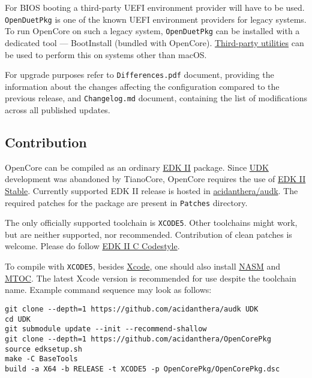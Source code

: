 \documentclass[]{article}
\begin{document}
For BIOS booting a third-party UEFI environment provider will have to
be used. \texttt{OpenDuetPkg} is one of the known UEFI environment providers
for legacy systems. To run OpenCore on such a legacy system, \texttt{OpenDuetPkg}
can be installed with a dedicated tool --- BootInstall (bundled with OpenCore).
\href{https://github.com/corpnewt/gibMacOS}{Third-party utilities} can be used to
perform this on systems other than macOS.

For upgrade purposes refer to \texttt{Differences.pdf} document, providing
the information about the changes affecting the configuration compared
to the previous release, and \texttt{Changelog.md} document, containing
the list of modifications across all published updates.

\subsection{Contribution}\label{configuration-comp}

OpenCore can be compiled as an ordinary
\href{https://github.com/tianocore/tianocore.github.io/wiki/EDK-II}{EDK II} package.
Since \href{https://github.com/tianocore/tianocore.github.io/wiki/UDK}{UDK}
development was abandoned by TianoCore, OpenCore requires the use of
\href{https://github.com/tianocore/tianocore.github.io/wiki/EDK-II#stable-tags}{EDK II Stable}.
Currently supported EDK II release is hosted in
\href{https://github.com/acidanthera/audk}{acidanthera/audk}. The required patches
for the package are present in \texttt{Patches} directory.

The only officially supported toolchain is \texttt{XCODE5}. Other toolchains
might work, but are neither supported, nor recommended. Contribution of clean
patches is welcome. Please do follow
\href{https://github.com/tianocore/tianocore.github.io/wiki/Code-Style-C}{EDK II C Codestyle}.

To compile with \texttt{XCODE5}, besides \href{https://developer.apple.com/xcode}{Xcode},
one should also install \href{https://www.nasm.us}{NASM} and
\href{https://github.com/acidanthera/ocbuild/tree/master/external}{MTOC}.
The latest Xcode version is recommended for use despite the toolchain name. Example
command sequence may look as follows:

\begin{lstlisting}[caption=Compilation Commands, label=compile, style=ocbash]
git clone --depth=1 https://github.com/acidanthera/audk UDK
cd UDK
git submodule update --init --recommend-shallow
git clone --depth=1 https://github.com/acidanthera/OpenCorePkg
source edksetup.sh
make -C BaseTools
build -a X64 -b RELEASE -t XCODE5 -p OpenCorePkg/OpenCorePkg.dsc
\end{lstlisting}
\end{document}
